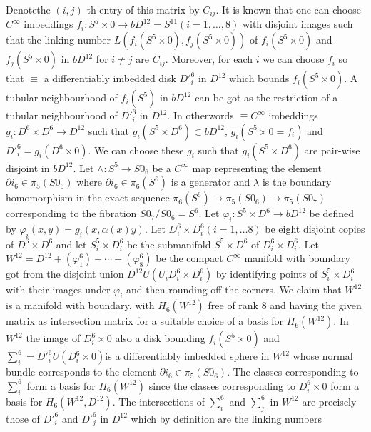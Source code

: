 Denote\pageoriginale the $(i, j)$ th entry of this matrix by
$C_{ij}$. It is known 
that one can choose $C^\infty$ imbeddings $f_i : S^5 \times 0 \to b
D^{12} = S^{11} (i = 1, \ldots, 8)$ with disjoint images such that the
linking number $L (f_i (S^5 \times 0), f_j (S^5 \times 0))$ of $f_i
(S^5 \times 0)$ and $f_j (S^5 \times 0)$ in $b D^{12} $ for $i \neq j$
are $C_{ij}$. Moreover, for each $i$ we can choose $f_i$ so that
$\equiv$ a differentiably imbedded disk $D'^6_i$ in $D^{12}$ which
bounds $f_i (S^5 \times 0)$. A tubular neighbourhood of $f_i (S^5)$ in
$b D^{12}$ can be got as the restriction of a tubular neighbourhood of
$D'^{6}_i$ in $ D^{12}$. In otherwords $\equiv  C^\infty$ imbeddings
$g_i : D^6 \times D^6 \to D^{12}$ such that $g_i (S^5 \times D^6)
\subset b
D^{12}$, $g_i (S^5 \times 0 = f_i)$ and $D'^6_i = g_i (D^6 \times 0)$. We
can choose these $g_i$ such that $g_i(S^5 \times D^6)$ are pair-wise
disjoint in $b D^{12}$. Let $\wedge : S^5 \to S0_6$ be a $C^\infty$
map representing the element $\partial i_6 \in  \pi_5 (S0_6)$
where $\partial i_6 \in \pi_6 (S^6)$ is a generator and $\lambda$
is the boundary homomorphism in the exact sequence $\pi_6 (S^6) \to
\pi_5 (S0_6) \to \pi_5 (S0_7)$ corresponding to the fibration $S0_7 /
S0_6 = S^6$. Let $ \varphi _i : S^5 \times D^6 \to b D^{12}$ be
defined by $\varphi_i (x, y) = g_i (x, \alpha (x) y)$. Let $D_i^6
\times D^6_i (i = 1, \ldots 8)$ be eight disjoint copies of $D^6
\times D^6$ and let $S^5_i \times D^6_i$ be the submanifold $S^5
\times D^6$ of $D^6_i \times D^6_i$. Let $W^{12} = D^{12} +
(\varphi^6_1) + \cdots + (\varphi^6_8)$ be the compact $C^\infty$
manifold with boundary got from the disjoint union $D^{12} U (U_i
D^6_i \times D^6_i)$ by identifying points of $S^5_i \times D^6_i$
with their images under $\varphi_i$ and then rounding off the
corners. We claim that $W^{12}$ is a manifold with boundary, with $H_6
(W^{12})$  free of rank 8 and having the given matrix as intersection
matrix for a suitable choice of a basis for $ H_6 (W^{12})$. In
$W^{12}$ the image of $D^6_i \times 0$ also a disk bounding $f_i (S^5
\times 0)$ and $\sum^6_i = D'^6_i U(D^6_i \times 0)$\pageoriginale is a
differentiably imbedded sphere in $W^{12}$ whose normal bundle
corresponds to the element $ \partial i_6 \in \pi_5
(S0_6)$. The classes  corresponding to $\sum^6_i$ form a basis for
$H_6 (W^{12})$ since the classes corresponding to $D^6_i \times 0$
form a basis for $H_6 (W^{12}, D^{12})$. The intersections of
$\sum^6_i$ and $\sum^6_j$ in $W^{12}$ are precisely those of $D'^6_i$
and $D'^6_j$ in $D^{12}$ which by definition are the linking numbers
